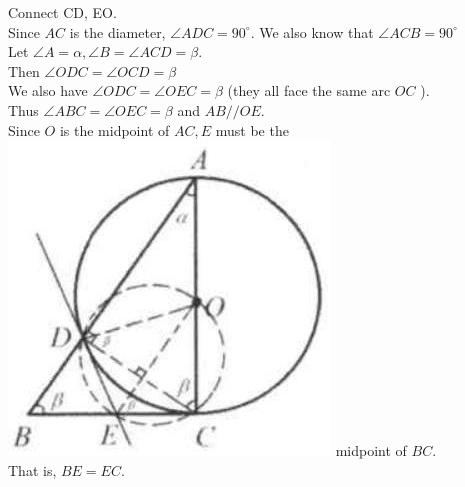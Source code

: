 \documentclass{article}
\begin{document}
Connect CD, EO.\\
Since \(A C\) is the diameter, \(\angle A D C=90^{\circ}\). We also know that \(\angle A C B=90^{\circ}\)\\
Let \(\angle A=\alpha, \angle B=\angle A C D=\beta\).\\
Then \(\angle O D C=\angle O C D=\beta\)\\
We also have \(\angle O D C=\angle O E C=\beta\) (they all face the same arc \(O C\) ).\\
Thus \(\angle A B C=\angle O E C=\beta\) and \(A B / / O E\).\\
Since \(O\) is the midpoint of \(A C, E\) must be the\\
\includegraphics[width=\textwidth]{images/195(2).jpg} midpoint of \(B C\).\\
That is, \(B E=E C\).
\end{document}
